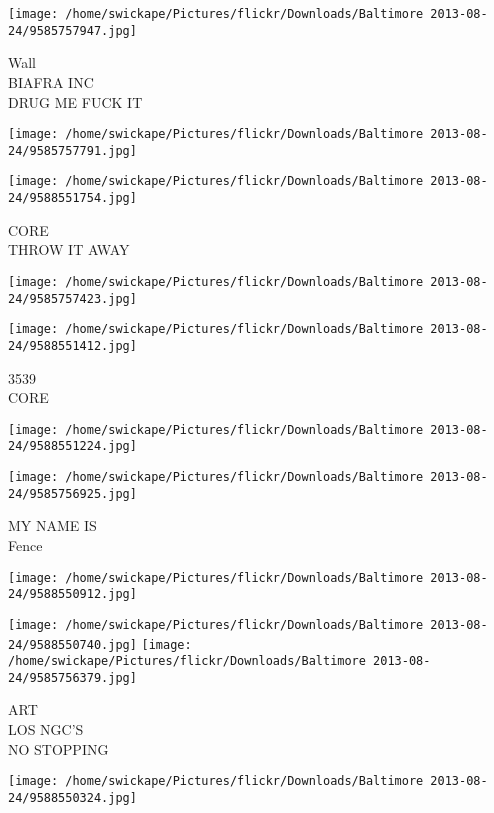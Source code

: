 \documentclass[10pt,letterpaper]{article}
\begin{document}
\texttt{[image: /home/swickape/Pictures/flickr/Downloads/Baltimore 2013-08-24/9585757947.jpg]}

Wall\\
BIAFRA INC\\
DRUG ME FUCK IT\\
\pagebreak

\texttt{[image: /home/swickape/Pictures/flickr/Downloads/Baltimore 2013-08-24/9585757791.jpg]}

\vspace{0.25in}
\texttt{[image: /home/swickape/Pictures/flickr/Downloads/Baltimore 2013-08-24/9588551754.jpg]}

CORE\\
THROW IT AWAY\\
\pagebreak

\texttt{[image: /home/swickape/Pictures/flickr/Downloads/Baltimore 2013-08-24/9585757423.jpg]}

\vspace{0.25in}
\texttt{[image: /home/swickape/Pictures/flickr/Downloads/Baltimore 2013-08-24/9588551412.jpg]}

3539\\
CORE\\
\pagebreak

\texttt{[image: /home/swickape/Pictures/flickr/Downloads/Baltimore 2013-08-24/9588551224.jpg]}

\vspace{0.25in}
\texttt{[image: /home/swickape/Pictures/flickr/Downloads/Baltimore 2013-08-24/9585756925.jpg]}

MY NAME IS\\
Fence\\
\pagebreak

\texttt{[image: /home/swickape/Pictures/flickr/Downloads/Baltimore 2013-08-24/9588550912.jpg]}

\vspace{0.25in}
\texttt{[image: /home/swickape/Pictures/flickr/Downloads/Baltimore 2013-08-24/9588550740.jpg]}
\texttt{[image: /home/swickape/Pictures/flickr/Downloads/Baltimore 2013-08-24/9585756379.jpg]}

ART\\
LOS NGC'S\\
NO STOPPING\\
\pagebreak

\texttt{[image: /home/swickape/Pictures/flickr/Downloads/Baltimore 2013-08-24/9588550324.jpg]}
\end{document}
